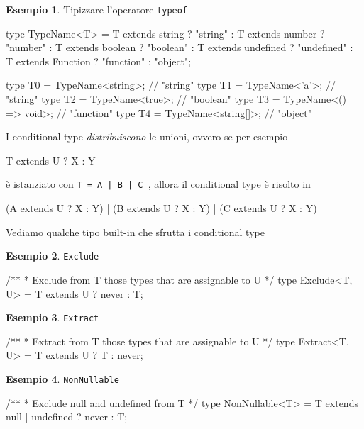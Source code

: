 \documentclass[12pt]{article}
\theoremstyle{definition}
\newtheorem{example}{Esempio}[subsection]
\newenvironment{code}
  {\vspace{0.5cm} \VerbatimEnvironment\begin{typescriptcode}}
  {\end{typescriptcode} \vspace{0.2cm}}
\begin{document}
\begin{example}
Tipizzare l'operatore \texttt{typeof}

\begin{code}
type TypeName<T> =
    T extends string ? "string" :
    T extends number ? "number" :
    T extends boolean ? "boolean" :
    T extends undefined ? "undefined" :
    T extends Function ? "function" :
    "object";

type T0 = TypeName<string>;  // "string"
type T1 = TypeName<'a'>;  // "string"
type T2 = TypeName<true>;  // "boolean"
type T3 = TypeName<() => void>;  // "function"
type T4 = TypeName<string[]>;  // "object"
\end{code}
\end{example}

I conditional type \emph{distribuiscono} le unioni, ovvero se per esempio

\begin{code}
T extends U ? X : Y
\end{code}

è istanziato con \texttt{T = A | B | C }, allora il conditional type è risolto in

\begin{code}
  (A extends U ? X : Y)
| (B extends U ? X : Y)
| (C extends U ? X : Y)
\end{code}

Vediamo qualche tipo built-in che sfrutta i conditional type

\begin{example}
\texttt{Exclude}

\begin{code}
/**
 * Exclude from T those types that are assignable to U
 */
type Exclude<T, U> = T extends U ? never : T;
\end{code}
\end{example}

\begin{example}
\texttt{Extract}

\begin{code}
/**
 * Extract from T those types that are assignable to U
 */
type Extract<T, U> = T extends U ? T : never;
\end{code}
\end{example}

\begin{example}
\texttt{NonNullable}

\begin{code}
/**
 * Exclude null and undefined from T
 */
type NonNullable<T> = T extends null | undefined ? never : T;
\end{code}
\end{example}
\end{document}
